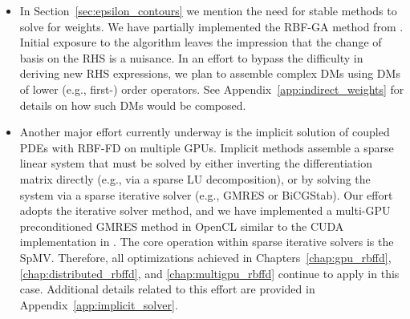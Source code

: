 \begin{itemize}
\item In Section~\ref{sec:epsilon_contours} we mention the need for stable methods to solve for weights. We have partially implemented the RBF-GA method from \cite{Fornberg2012}.  Initial exposure to the algorithm leaves the impression that the change of basis on the RHS is a nuisance. In an effort to bypass the difficulty in deriving new RHS expressions, we plan to assemble complex DMs using DMs of lower (e.g., first-) order operators. See Appendix~\ref{app:indirect_weights} for details on how such DMs would be composed.
\item Another major effort currently underway is the implicit solution of coupled PDEs with RBF-FD on multiple GPUs. Implicit methods assemble a sparse linear system that must be solved by either inverting the differentiation matrix directly (e.g., via a sparse LU decomposition), or by solving the system via a sparse iterative solver (e.g., GMRES or BiCGStab).
Our effort adopts the iterative solver method, and we have implemented a multi-GPU preconditioned GMRES method in OpenCL similar to the CUDA implementation in \cite{Bahi2011}. The core operation within sparse iterative solvers is the SpMV. Therefore, all optimizations achieved in Chapters~\ref{chap:gpu_rbffd}, \ref{chap:distributed_rbffd}, and \ref{chap:multigpu_rbffd} continue to apply in this case. Additional details related to this effort are provided in Appendix~\ref{app:implicit_solver}.

\end{itemize}

